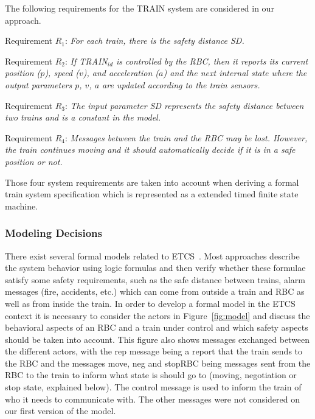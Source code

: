 \documentclass{template/openetcs_article}
\begin{document}
The following requirements for the TRAIN system are considered in our approach.

\begin{description}
\item{Requirement $R_1$:} \textit{For each train, there is the safety distance SD.}

\item{Requirement $R_2$:} \textit{If TRAIN$_{id}$ is controlled by the RBC, then it reports its current position ($p$), speed ($v$), and acceleration ($a$) and the next internal state where the output parameters $p$, $v$, $a$ are updated according to the train sensors.}

\item{Requirement $R_3$:} \textit{The input parameter SD represents the safety distance between two trains and is a constant in the model.}

\item{Requirement $R_4$:}  \textit{Messages between the train and the RBC may be lost. However, the train continues moving and it should automatically decide if it is in a safe position or not.}
\end{description}

Those four system requirements are taken into account when deriving a formal train system specification which is represented as a extended timed finite state machine.



\subsubsection{Modeling Decisions} 

There exist several formal models related to ETCS~\cite{pjesh01,zh05,Ammann2011,ltlzx11,Feuser2012}. Most approaches describe the system behavior using logic formulas and then verify whether these formulae satisfy some safety requirements, such as the safe distance between trains, alarm messages (fire, accidents, etc.) which can come from outside a train and RBC as well as from inside the train. 
In order to develop a formal model in the ETCS context it is necessary to consider the actors in Figure~\ref{fig:model} and discuss the behavioral aspects of an RBC and a train under control and which safety aspects should be taken into account. This figure also shows messages exchanged between the different actors, with the rep message being a report that the train sends to the RBC and the messages move, neg and stopRBC being messages sent from the RBC to the train to inform what state is should go to (moving, negotiation or stop state, explained below). The control message is used to inform the train of who it needs to communicate with. The other messages were not considered on our first version of the model.
\end{document}
